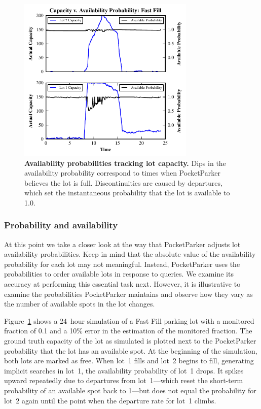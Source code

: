 \begin{figure}[t]
\centering
\includegraphics[width=3.325in]{./simulator/figures/tracking_fastfill.pdf}

\caption{\textbf{Availability probabilities tracking lot capacity.} Dips in
the availability probability correspond to times when PocketParker believes
the lot is full. Discontinuities are caused by departures, which set the
instantaneous probability that the lot is available to 1.0.}

\label{fig-trackingexample}
\end{figure}

\subsubsection{Probability and availability}

At this point we take a closer look at the way that PocketParker adjusts lot
availability probabilities. Keep in mind that the absolute value of the
availability probability for each lot may not meaningful. Instead,
PocketParker uses the probabilities to order available lots in response to
queries. We examine its accuracy at performing this essential task next.
However, it is illustrative to examine the probabilities PocketParker
maintains and observe how they vary as the number of available spots in the
lot changes.

Figure~\ref{fig-trackingexample} shows a 24~hour simulation of a Fast Fill
parking lot with a monitored fraction of 0.1 and a 10\% error in the
estimation of the monitored fraction. The ground truth capacity of the lot as
simulated is plotted next to the PocketParker probability that the lot has an
available spot. At the beginning of the simulation, both lots are marked as
free. When lot~1 fills and lot~2 begins to fill, generating implicit searches
in lot~1, the availability probability of lot~1 drops. It spikes upward
repeatedly due to departures from lot~1---which reset the short-term
probability of an available spot back to 1---but does not equal the
probability for lot~2 again until the point when the departure rate for lot~1
climbs.


